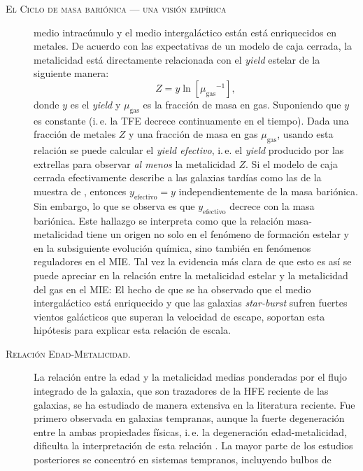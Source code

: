 \documentclass[xcolor=dvipsnames,4pt,hyperref={colorlinks,citecolor=black,linkcolor=black,urlcolor=black}]{beamer}
\begin{document}
\begin{frame}[allowframebreaks]{\textsc{El Ciclo de masa bariónica --- una visión empírica}}
\begin{description}
medio intracúmulo y el medio intergaláctico están está enriquecidos en metales.
%
De acuerdo con las expectativas de un modelo de caja cerrada, la metalicidad está directamente
relacionada con el \emph{yield} estelar de la siguiente manera:
%
$$
Z = y\ln{\left[{\mu_\text{gas}}^{-1}\right]},
$$
%
donde $y$ es el \emph{yield} y $\mu_\text{gas}$ es la fracción de masa en gas. Suponiendo que $y$ es
constante (i.\,e. la TFE decrece \alert{continuamente} en el tiempo). Dada una fracción de metales
$Z$ y una fracción de masa en gas $\mu_\text{gas}$, usando esta relación se puede calcular el
\emph{yield efectivo}, i.\,e. el \emph{yield} producido por las extrellas para observar \emph{al
menos} la metalicidad $Z$. Si el modelo de caja cerrada efectivamente describe a las galaxias
tardías como las de la muestra de \citeauthor{Tremonti2004}, entonces $y_\text{efectivo}=y$
independientemente de la masa bariónica. Sin embargo, lo que se observa es que $y_\text{efectivo}$
decrece con la masa bariónica.
Este hallazgo se interpreta como que la relación masa-metalicidad tiene un origen no solo en el
fenómeno de formación estelar y en la subsiguiente evolución química, sino también en fenómenos
reguladores en el MIE. Tal vez la evidencia más clara de que esto es así se puede apreciar en la
relación entre la metalicidad estelar y la metalicidad del gas en el MIE:
El hecho de que se ha observado que el medio intergaláctico está enriquecido y que las galaxias
\emph{star-burst} sufren fuertes vientos galácticos que superan la velocidad de escape, soportan
esta hipótesis para explicar esta relación de escala.
%
\item[\textsc{Relación Edad-Metalicidad.}] La relación entre la edad y la metalicidad medias
ponderadas por el flujo integrado de la galaxia, que son trazadores de la HFE reciente de las
galaxias, se ha estudiado de manera extensiva en la literatura reciente. Fue primero observada en
galaxias tempranas, aunque la fuerte degeneración entre la ambas propiedades físicas, i.\,e. la
degeneración edad-metalicidad, dificulta la interpretación de esta relación \citep{Worthey1994}. La
mayor parte de los estudios posteriores se concentró en sistemas tempranos, incluyendo bulbos de

\end{description}
\end{frame}
\end{document}
